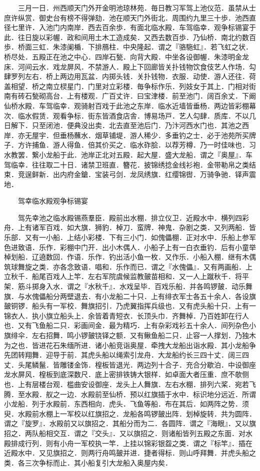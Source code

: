 　　三月一日．州西顺天门外开金明池琼林苑．毎日教习军驾上池仪范．虽禁从士庶许纵赏．御史台有榜不得弹劾．池在顺天门外街北．周围约九里三十歩．池西直径七里许．入池门内南岸．西去百余歩．有面北临水殿．车驾临幸．观争标锡宴于此．往日旋以彩幄．政和间用土木工造成矣．又西去数百歩．乃仙桥．南北约数百歩．桥面三虹．朱漆阑楯．下排鴈柱．中央隆起．谓之『骆駞虹』．若飞虹之状．桥尽处．五殿正在池之中心．四岸石甃．向背大殿．中坐各设御幄．朱漆明金龙床．河间云水．戏龙屏风．不禁游人．殿上下回廊皆关扑钱物饮食伎艺人作场．勾肆罗列左右．桥上两边用瓦盆．内掷头钱．关扑钱物．衣服．动使．游人还往．荷盖相望．桥之南立棂星门．门里对立彩楼．毎争标作乐．列妓女于其上．门相对街南有砖石甃砌高台．上有楼观．广百丈许．曰宝津楼．前至池门．阔百余丈．下阚仙桥水殿．车驾临幸．观骑射百戏于此池之东岸．临水近墙皆垂杨．两边皆彩棚幕次．临水假赁．观看争标．街东皆酒食店舎．博易场戸．艺人勾肆．质库．不以几日解下．只至闭池．便典没出卖．北去直至池后门．乃汴河西水门也．其池之西岸．亦无屋宇．但垂杨蘸水．烟草铺堤．游人稀少．多垂钓之士．必于池苑所买牌子．方许捕鱼．游人得鱼．倍其价买之．临水砟脍．以荐芳樽．乃一时佳味也．习水教罢．繋小龙船于此．池岸正北对五殿．起大屋．盛大龙船．谓之『奥屋』．车驾临幸．往往取二十日．诸禁卫班直．簪花．披锦绣捻金线衫袍．金带勒帛之类结束．竞逞鲜新．出内府金鎗．宝装弓剑．龙凤绣旗．红缨锦辔．万骑争驰．铎声震地．

　　驾幸临水殿观争标锡宴

　　驾先幸池之临水殿锡燕羣臣．殿前出水棚．排立仪卫．近殿水中．横列四彩舟．上有诸军百戏．如大旗．狮豹．棹刀．蛮牌．神鬼．杂剧之类．又列两船．皆乐部．又有一小船．上结小彩楼．下有三小门．如傀儡棚．正对水中．乐船上参军色进致语．乐作．彩棚中门开．出小木偶人．小船子上有一白衣垂钓．后有小童举棹划船．辽遶数回．作语．乐作．钓出活小鱼一枚．又作乐．小船入棚．继有木偶筑球舞旋之类．亦各念致语．唱和．乐作而已．谓之『水傀儡』．又有两画船．上立秋千．船尾百戏人上竿．左右军院虞候监教皷苗相和．又一人上蹴秋千．将平架．筋斗掷身入水．谓之『水秋千』．水戏呈毕．百戏乐船．并各鸣锣皷．动乐舞旗．与水傀儡船分两壁退去．有小龙船二十只．上有绯衣军士各五十余人．各设旗皷铜锣．船头有一军校．舞旗招引．乃虎翼指挥兵级也．又有虎头船十只．上有一锦衣人．执小旗立船头上．余皆着青短衣．长顶头巾．齐舞棹．乃百姓卸在行人也．又有飞鱼船二只．彩画间金．最为精巧．上有杂彩戏衫五十余人．间列杂色小旗绯伞．左右招舞．鸣小锣皷铙铎之额．又有鳅鱼船二只．止容一人撑划．乃独木为之也．皆进花石朱缅所进．诸小船竞诣奥屋．牵拽大龙船出诣水殿．其小龙船争先团转翔舞．迎导于前．其虎头船以绳索引龙舟．大龙船约长三四十丈．阔三四丈．头尾鳞鬣．皆雕镂金饰．楻板皆退光．两边列十合子．充合分歇泊．中设御座龙水屏风．楻板到底深数尺．底上密排铁铸大银样．如卓面大者压重．庶不欹侧也．上有层楼台观．槛曲安设御座．龙头上人舞旗．左右水棚．排列六桨．宛若飞腾．至水殿．舣之一边．水殿前至仙桥．预以红旗插于水中．标识地分远近．所谓小龙船．列于水殿前．东西相向．虎头．飞鱼等船．布在其后．如两阵之势．须臾．水殿前水棚上一军校以红旗招之．龙船各鸣锣皷出阵．划棹旋转．共为圆阵．谓之『旋罗』．水殿前又以旗招之．其船分而为二．各圆阵．谓之『海眼』．又以旗招之．两队船相交互．谓之『交头』．又以旗招之．则诸船皆列五殿之东面．对水殿排成行列．则有小舟一军校执一竿．上挂以锦彩银盌之类．谓之『标竿』．插在近殿水中．又见旗招之．则两行舟鸣皷并进．捷者得标．则山呼拜舞．并虎头船之类．各三次争标而止．其小船复引大龙船入奥屋内矣．

